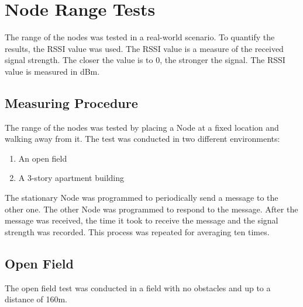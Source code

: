     

\section{Node Range Tests}
The range of the nodes was tested in a real-world scenario.
To quantify the results, the RSSI value was used. The RSSI value
is a measure of the received signal strength. The closer the value is to 0,
the stronger the signal. The RSSI value is measured in dBm.

    \subsection{Measuring Procedure}
    The range of the nodes was tested by placing a Node at a fixed location
    and walking away from it. 
    The test was conducted in two different environments:
    \begin{enumerate}
        \item An open field
        \item A 3-story apartment building
    \end{enumerate}

    The stationary Node was programmed to periodically send a
    message to the other one. The other Node was programmed to
    respond to the message. After the message was received,
    the time it took to receive the message and the 
    signal strength was recorded. 
    This process was repeated for averaging ten times.

    \subsection{Open Field}
    The open field test was conducted in a field with no obstacles
    and up to a distance of 160m.
    \vspace{1cm}

